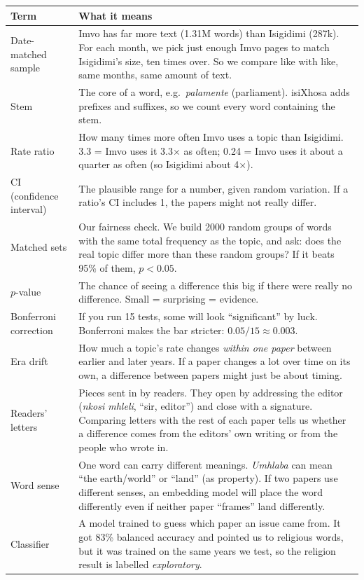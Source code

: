 \documentclass[11pt]{article}
\begin{document}
{\small
\begin{xltabular}{\linewidth}{@{}p{3.6cm}X@{}}
\toprule
\textbf{Term} & \textbf{What it means} \\ \midrule\endhead
Date-matched sample & Imvo has far more text (1.31M words) than Isigidimi (287k). For each month, we pick just enough Imvo pages to match Isigidimi's size, ten times over. So we compare like with like, same months, same amount of text. \\
Stem & The core of a word, e.g.\ \emph{palamente} (parliament). isiXhosa adds prefixes and suffixes, so we count every word containing the stem. \\
Rate ratio & How many times more often Imvo uses a topic than Isigidimi. 3.3 = Imvo uses it 3.3$\times$ as often; 0.24 = Imvo uses it about a quarter as often (so Isigidimi about 4$\times$). \\
CI (confidence interval) & The plausible range for a number, given random variation. If a ratio's CI includes 1, the papers might not really differ. \\
Matched sets & Our fairness check. We build 2000 random groups of words with the same total frequency as the topic, and ask: does the real topic differ more than these random groups? If it beats 95\% of them, $p<0.05$. \\
$p$-value & The chance of seeing a difference this big if there were really no difference. Small = surprising = evidence. \\
Bonferroni correction & If you run 15 tests, some will look ``significant'' by luck. Bonferroni makes the bar stricter: $0.05/15 \approx 0.003$. \\
Era drift & How much a topic's rate changes \emph{within one paper} between earlier and later years. If a paper changes a lot over time on its own, a difference between papers might just be about timing. \\
Readers' letters & Pieces sent in by readers. They open by addressing the editor (\emph{nkosi mhleli}, ``sir, editor'') and close with a signature. Comparing letters with the rest of each paper tells us whether a difference comes from the editors' own writing or from the people who wrote in. \\
Word sense & One word can carry different meanings. \emph{Umhlaba} can mean ``the earth/world'' or ``land'' (as property). If two papers use different senses, an embedding model will place the word differently even if neither paper ``frames'' land differently. \\
Classifier & A model trained to guess which paper an issue came from. It got 83\% balanced accuracy and pointed us to religious words, but it was trained on the same years we test, so the religion result is labelled \emph{exploratory}. \\

\end{xltabular}}
\end{document}
